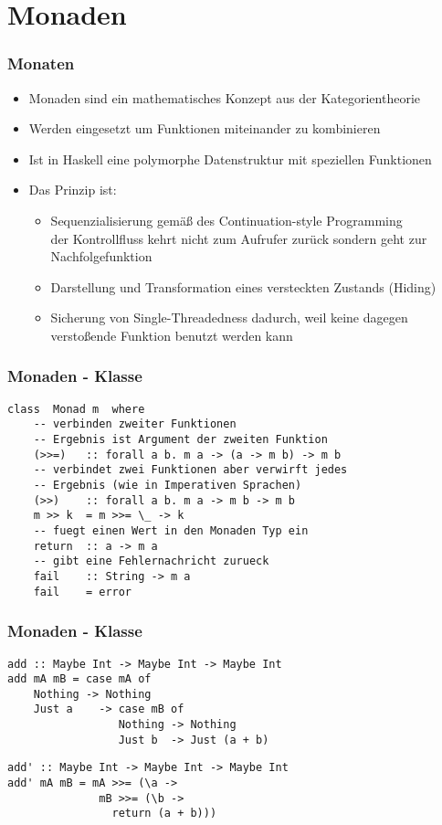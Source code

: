 \section{Monaden}
\begin{frame}
\frametitle{Monaten}
\begin{block}{\vspace*{-3ex}}
\begin{itemize}
\item Monaden sind ein mathematisches Konzept aus der Kategorientheorie
\item Werden eingesetzt um Funktionen miteinander zu kombinieren 
\item Ist in Haskell eine polymorphe Datenstruktur mit speziellen Funktionen
\item Das Prinzip ist:
\begin{itemize}
\item Sequenzialisierung gemäß des Continuation-style Programming \\
	der Kontrollfluss kehrt nicht zum Aufrufer zurück sondern geht zur Nachfolgefunktion 
\item Darstellung und Transformation eines versteckten Zustands (Hiding)
\item Sicherung von Single-Threadedness dadurch, weil keine dagegen verstoßende Funktion benutzt werden kann
\end{itemize}
\end{itemize}
\end{block}
\end{frame}

\begin{frame}[fragile]
\frametitle{Monaden - Klasse}
\begin{lstlisting}
class  Monad m  where
    -- verbinden zweiter Funktionen
    -- Ergebnis ist Argument der zweiten Funktion
    (>>=)   :: forall a b. m a -> (a -> m b) -> m b
    -- verbindet zwei Funktionen aber verwirft jedes 
    -- Ergebnis (wie in Imperativen Sprachen)
    (>>)    :: forall a b. m a -> m b -> m b
    m >> k  = m >>= \_ -> k
    -- fuegt einen Wert in den Monaden Typ ein
    return  :: a -> m a
    -- gibt eine Fehlernachricht zurueck
    fail    :: String -> m a
    fail    = error
\end{lstlisting}	
\end{frame}

\begin{frame}[fragile]
\frametitle{Monaden - Klasse}
\begin{lstlisting}
add :: Maybe Int -> Maybe Int -> Maybe Int
add mA mB = case mA of
    Nothing -> Nothing
    Just a    -> case mB of
                 Nothing -> Nothing
                 Just b  -> Just (a + b)
\end{lstlisting}	
\pause
\begin{lstlisting}
add' :: Maybe Int -> Maybe Int -> Maybe Int
add' mA mB = mA >>= (\a ->
              mB >>= (\b ->
                return (a + b)))
\end{lstlisting}	
\end{frame}

